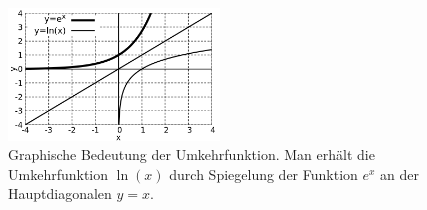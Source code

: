 \begin{figure}
    \centering
    \includegraphics[width=0.5\textwidth]{./gnuplot/inverse-function-reflection}
    \caption[Graphische Bedeutung der Umkehrfunktion]{Graphische Bedeutung der Umkehrfunktion. Man erhält die Umkehrfunktion $\ln(x)$ durch Spiegelung der Funktion $e^x$ an der Hauptdiagonalen $y=x$.}
    \label{fig:InvFunRefl}
\end{figure}

